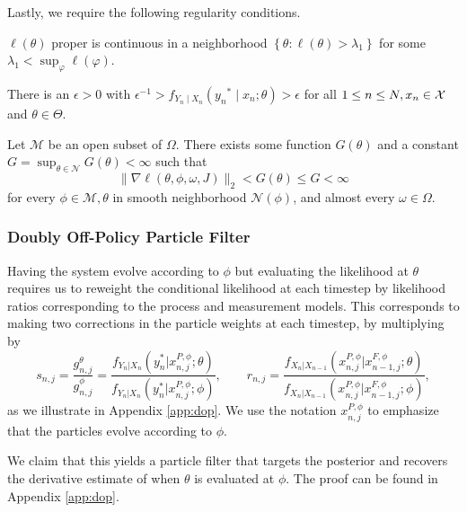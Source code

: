 \documentclass{article}
\begin{document}
Lastly, we require the following regularity conditions.

\begin{aspt} $\ell(\theta)$ proper is continuous in a neighborhood $\left\{\theta: \ell(\theta)>\lambda_1\right\}$ for some $\lambda_1<\sup _{\varphi} \ell(\varphi)$.
\end{aspt}

\begin{aspt} There is an $\epsilon>0$ with $\epsilon^{-1}>f_{Y_n \mid X_n}\left(y_n{ }^* \mid x_n; \theta\right)>\epsilon$ for all $1 \leq n \leq N, x_n \in {\mathcal{X}}$ and $\theta \in \Theta.$
\end{aspt}

\begin{aspt}
\label{assump:local-bounded-derivative}
Let $\mathcal{M}$ be an open subset of $\Omega$. There exists some function $G(\theta)$ and a constant $G=\sup _{\theta \in \mathcal{N}} G(\theta)<\infty$ such that
    $$
    \|\nabla \ell(\theta, \phi, \omega, J)\|_2<G(\theta) \leq G<\infty
    $$
    for every $\phi \in \mathcal{M}, \theta$ in smooth neighborhood $\mathcal{N}(\phi)$, and almost every $\omega \in \Omega$.
\end{aspt}

\subsubsection{Doubly Off-Policy Particle Filter}

Having the system evolve according to $\phi$ but evaluating the likelihood at $\theta$ requires us to reweight the conditional likelihood at each timestep by likelihood ratios corresponding to the process and measurement models. This corresponds to making two corrections in the particle weights at each timestep, by multiplying by 
\begin{equation}
    s_{n,j}=\frac{g_{n,j}^\theta}{g_{n,j}^{\phi}}=\frac{f_{Y_n|X_n}(y_n^*|x_{n,j}^{P, \phi}; \theta)}{f_{Y_n|X_n}(y_n^*|x_{n,j}^{P,\phi}; \phi)}, \qquad r_{n,j}=\frac{f_{X_n|X_{n-1}}(x_{n,j}^{P, \phi}|x_{n-1,j}^{F, \phi}; \theta)}{f_{X_n|X_{n-1}}(x_{n,j}^{P, \phi}|x_{n-1,j}^{F, \phi}; \phi)},
\end{equation}
as we illustrate in Appendix \ref{app:dop}. We use the notation $x_{n,j}^{P, \phi}$ to emphasize that the particles evolve according to $\phi$. 

We claim that this yields a particle filter that targets the posterior and recovers the derivative estimate of \citet{doucet2011sf, scibior2021dpf} when $\theta$ is evaluated at $\phi$. The proof can be found in Appendix \ref{app:dop}. 
\end{document}
